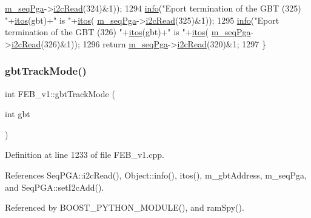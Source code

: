 \begin{DoxyCode}
      \hyperlink{classFEB__v1_a6c7804ac86796f233a8393043adf2e77}{m\_seqPga}->\hyperlink{classSeqPGA_a7cd344df2be99f3a02b487f80e87b27e}{i2cRead}(324)&1));
1294   \hyperlink{classObject_a644fd329ea4cb85f54fa6846484b84a8}{info}(\textcolor{stringliteral}{"Eport termination of the GBT (325) "}+\hyperlink{Tools_8h_af330027dbdafb9a30768b3613c553e60}{itos}(gbt)+\textcolor{stringliteral}{" is "}+\hyperlink{Tools_8h_af330027dbdafb9a30768b3613c553e60}{itos}(
      \hyperlink{classFEB__v1_a6c7804ac86796f233a8393043adf2e77}{m\_seqPga}->\hyperlink{classSeqPGA_a7cd344df2be99f3a02b487f80e87b27e}{i2cRead}(325)&1));
1295   \hyperlink{classObject_a644fd329ea4cb85f54fa6846484b84a8}{info}(\textcolor{stringliteral}{"Eport termination of the GBT (326) "}+\hyperlink{Tools_8h_af330027dbdafb9a30768b3613c553e60}{itos}(gbt)+\textcolor{stringliteral}{" is "}+\hyperlink{Tools_8h_af330027dbdafb9a30768b3613c553e60}{itos}(
      \hyperlink{classFEB__v1_a6c7804ac86796f233a8393043adf2e77}{m\_seqPga}->\hyperlink{classSeqPGA_a7cd344df2be99f3a02b487f80e87b27e}{i2cRead}(326)&1));
1296   \textcolor{keywordflow}{return} \hyperlink{classFEB__v1_a6c7804ac86796f233a8393043adf2e77}{m\_seqPga}->\hyperlink{classSeqPGA_a7cd344df2be99f3a02b487f80e87b27e}{i2cRead}(320)&1;
1297 \}
\end{DoxyCode}
\mbox{\label{classFEB__v1_a25eeb132e9058cd421a085878fba9204}} 
\subsubsection{\texorpdfstring{gbt\+Track\+Mode()}{gbtTrackMode()}}
{\footnotesize\ttfamily int F\+E\+B\+\_\+v1\+::gbt\+Track\+Mode (\begin{DoxyParamCaption}\item[{int}]{gbt }\end{DoxyParamCaption})}



Definition at line 1233 of file F\+E\+B\+\_\+v1.\+cpp.



References Seq\+P\+G\+A\+::i2c\+Read(), Object\+::info(), itos(), m\+\_\+gbt\+Address, m\+\_\+seq\+Pga, and Seq\+P\+G\+A\+::set\+I2c\+Add().



Referenced by B\+O\+O\+S\+T\+\_\+\+P\+Y\+T\+H\+O\+N\+\_\+\+M\+O\+D\+U\+L\+E(), and ram\+Spy().


